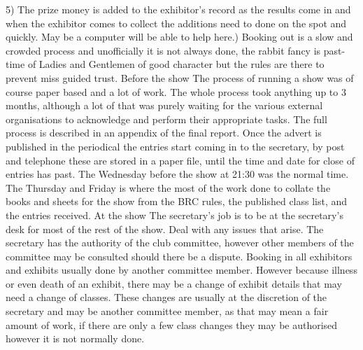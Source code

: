 \documentclass[a4paper,11pt]{report}
\begin{document}
5) The prize money is added to the exhibitor's record as the results come in and when the exhibitor comes to collect the additions need to done on the spot and quickly. May be a computer will be able to help here.) Booking out is a slow and crowded process and unofficially it is not always done, the rabbit fancy is past-time of Ladies and Gentlemen of good character but the rules are there to prevent miss guided trust.
\newpage
{}\newline
\newline
Before the show\newline
\newline
The process of running a show was of course paper based and a lot of work. The whole process took anything up to 3 months, although a lot of that was purely waiting for the various external organisations to acknowledge and perform their appropriate tasks. The full process is described in an appendix of the final report. Once the advert is published in the periodical the entries start coming in to the secretary, by post and telephone these are stored in a paper file, until the time and date for close of entries has past. The Wednesday before the show at 21:30 was the normal time. The Thursday and Friday is where the most of the work done to collate the books and sheets for the show from the BRC rules, the published class list, and the entries received.\newline\newline
At the show\newline
The secretary's job is to be at the secretary's desk for most of the rest of the show. Deal with any issues that arise.\newline
The secretary has the authority of the club committee, however other members of the committee may be consulted should there be a dispute.\newline 
Booking in all exhibitors and exhibits usually done by another committee member. However because illness or even death of an exhibit, there may be a change of exhibit details that may need a change of classes. These changes are usually at the discretion of the secretary and may be another committee member, as that may mean a fair amount of work, if there are only a few class changes they may be authorised however it is not normally done.\newline
\end{document}
